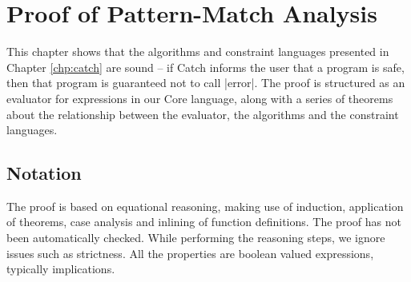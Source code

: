 \begin{comment}
-- equality substitution, replacing items
class SubstRep a b c | a c -> b, c b -> a, a b -> c where (/#) :: a -> b -> c
instance SubstRep (Prop (Sat a)) ([a], [b]) (Prop (Sat b))
instance SubstRep VarName ([VarName], [Expr]) Expr

instance Eq Value
instance Eq Expr

alt :: Alt -> Prop (Sat a)
pre' :: String -> [Expr] -> Prop (Sat Expr)
sub :: ([VarName],[Expr])

-- for BP
anys :: String -> Constraint
\end{code}

\h{#mp}\begin{code}
-- for MP
type Constraint = [Val]
data Val = [Pattern] :* [Pattern] | Any
data Pattern = Pattern CtorName [Val]
complete :: CtorName -> Pattern
nonRecs :: CtorName -> [Int]
merge :: [Pattern] -> [Pattern] -> [Pattern]
non :: [Int]
rec :: [Int]
\end{code}
\end{comment}



\chapter{Proof of Pattern-Match Analysis}
\label{chp:proof}

\newcommand{\lemma}[1]{(\textit{#1})}
\newcommand{\theorem}[2]{\lemma{#1} \vspace{-1mm} \\ \nopagebreak #2 }
\newcommand{\proof}[2][]{\textbf{Proof of \lemma{#2} \textsf{#1}} \\  \nopagebreak}

This chapter shows that the algorithms and constraint languages presented in Chapter \ref{chp:catch} are sound -- if Catch informs the user that a program is safe, then that program is guaranteed not to call |error|. The proof is structured as an evaluator for expressions in our Core language, along with a series of theorems about the relationship between the evaluator, the algorithms and the constraint languages.

\section{Notation}

The proof is based on equational reasoning, making use of induction, application of theorems, case analysis and inlining of function definitions. The proof has not been automatically checked. While performing the reasoning steps, we ignore issues such as strictness. All the properties are boolean valued expressions, typically implications.

